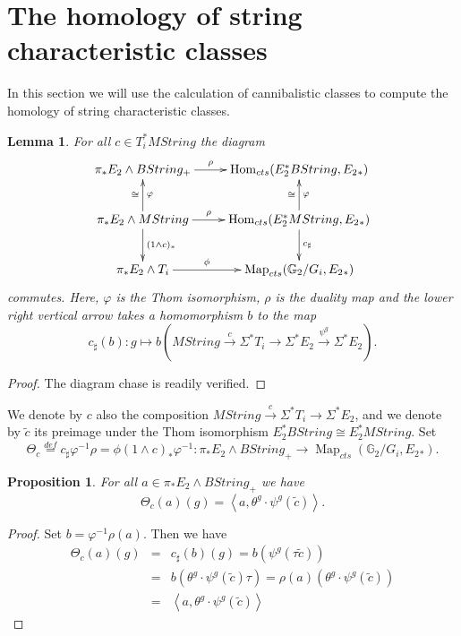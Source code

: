 \documentclass{amsart}
\DeclareMathOperator{\Map}{Map}
\newcommand {\G}{{\mathbb G}}
\newcommand{\lra}{\longrightarrow}              %
\DeclareMathOperator{\Hom}{Hom} \DeclareMathOperator{\Ext}{Ext}
\numberwithin{equation}{section}
\newtheorem{prop}[thm]{Proposition}
\newtheorem{lemma}[thm]{Lemma}
\theoremstyle{definition}  %
\newtheorem{set theory}[thm]{Set Theoretic Prelude}
\begin{document}
\section{The homology of string characteristic classes}\label{homology}
In this section we will use the calculation of cannibalistic classes to compute the  homology of string characteristic classes.
\begin{lemma}
For all $c\in T_i^* MString$ the  diagram 
$$ \xymatrix{\pi_* E_2 \wedge BString_+\ar[r]^-\rho &\Hom_{cts}(E_2^*BString, E_2{}_*)\\
\pi_* E_2 \wedge MString \ar[r]^-\rho \ar[u]_\varphi ^\cong \ar[d]^{(1\wedge c)_* }  &\Hom_{cts}(E_2^*MString, E_2{}_*)\ar[u]^\cong_\varphi  \ar[d]^{c_\sharp}  \\
\pi_* E_2 \wedge T_i \ar[r]^-\phi &\Map_{cts}(\G_2/G_i, E_2{}_*) }$$
commutes. Here, $\varphi $ is the Thom isomorphism, $\rho$ is the duality map and the lower right vertical arrow takes a homomorphism $b$ to the map
$$c_\sharp(b): g \mapsto b(MString \stackrel{c}{\lra} \Sigma ^*  T_i \lra \Sigma ^*  E_2 \stackrel{\psi^g}{\lra } \Sigma^*  E_2).$$
\end{lemma}
\begin{proof}
The diagram chase is readily verified.
\end{proof}
We denote by $c$ also the composition $MString \stackrel{c}{\lra} \Sigma ^*  T_i \lra \Sigma ^*  E_2$,
and we denote by $\tilde{c}$ its preimage under the Thom isomorphism $E_2^*BString\cong E_2^*MString$.
Set
$$\Theta_c\stackrel{def}{=} c_\sharp \varphi ^{-1} \rho=\phi (1\wedge c)_* \varphi^{-1}: \pi_*E_2\wedge BString _+\lra \Map_{cts}(\G_2/G_i,E_2{}_*).$$

\begin{prop}\label{canab}
For all $a \in \pi_* E_2\wedge BString _+$ we have
$$ \Theta_c(a)(g ) = \left< a, \theta^g\cdot  \psi^g (\tilde{c})\right>.$$

\end{prop}
\begin{proof} Set $b= \varphi^{-1} \rho (a)$. Then we have
\begin{eqnarray*}
 \Theta_c(a)(g ) &=& c_\sharp(b) (g) = b(\psi^g (\tau \tilde{c} )) \\
 &=&  b(\theta^g \cdot \psi^g (\tilde{c} )\tau )= \rho(a)(\theta^g \cdot \psi^g (\tilde{c} ))\\
&=&  \left< a, \theta^g \cdot \psi^g (\tilde{c})\right>
\end{eqnarray*}
\end{proof}
\end{document}
